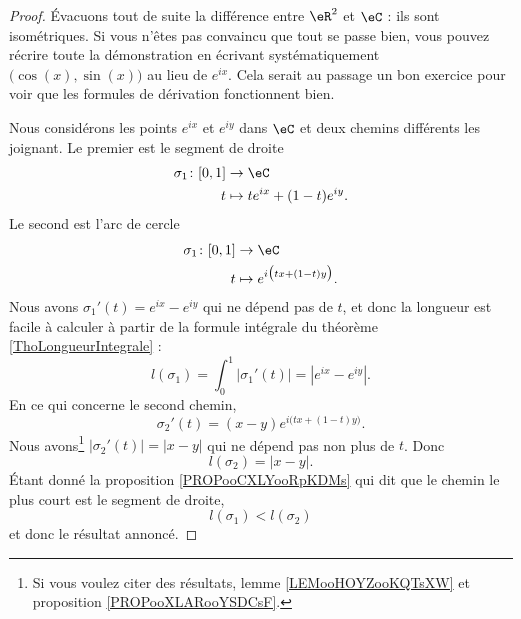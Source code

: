 \begin{proof}
	Évacuons tout de suite la différence entre \( \eR^2\) et \( \eC\) : ils sont isométriques. Si vous n'êtes pas convaincu que tout se passe bien, vous pouvez récrire toute la démonstration en écrivant systématiquement \( \big( \cos(x),\sin(x) \big)\) au lieu de \(  e^{ix}\). Cela serait au passage un bon exercice pour voir que les formules de dérivation fonctionnent bien.

	Nous considérons les points \(  e^{ix}\) et \(  e^{iy}\) dans \( \eC\) et deux chemins différents les joignant. Le premier est le segment de droite
	\begin{equation}
		\begin{aligned}
			\sigma_1\colon \mathopen[ 0 , 1 \mathclose] & \to \eC                        \\
			t                                           & \mapsto t e^{ix}+(1-t) e^{iy}.
		\end{aligned}
	\end{equation}
	Le second est l'arc de cercle
	\begin{equation}
		\begin{aligned}
			\sigma_1\colon \mathopen[ 0 , 1 \mathclose] & \to \eC                              \\
			t                                           & \mapsto  e^{i\big( tx+(1-t)y \big)}.
		\end{aligned}
	\end{equation}
	Nous avons \( \sigma_1'(t)= e^{ix}- e^{iy}\) qui ne dépend pas de \( t\), et donc la longueur est facile à calculer à partir de la formule intégrale du théorème \ref{ThoLongueurIntegrale} :
	\begin{equation}
		l(\sigma_1)=\int_0^1| \sigma_1'(t) |=|  e^{ix}- e^{iy} |.
	\end{equation}
	En ce qui concerne le second chemin,
	\begin{equation}
		\sigma_2'(t)=(x-y) e^{i\big( tx+(1-t)y \big)}.
	\end{equation}
	Nous avons\footnote{Si vous voulez citer des résultats, lemme \ref{LEMooHOYZooKQTsXW} et proposition \ref{PROPooXLARooYSDCsF}.} \( | \sigma_2'(t) |=| x-y |\) qui ne dépend pas non plus de \( t\). Donc
	\begin{equation}
		l(\sigma_2)=| x-y |.
	\end{equation}
	Étant donné la proposition \ref{PROPooCXLYooRpKDMs} qui dit que le chemin le plus court est le segment de droite,
	\begin{equation}
		l(\sigma_1)<l(\sigma_2)
	\end{equation}
	et donc le résultat annoncé.
\end{proof}

